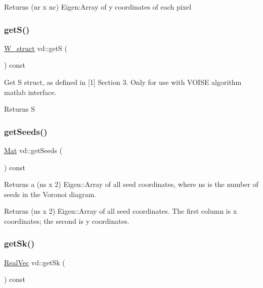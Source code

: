\begin{DoxyReturn}{Returns}
(nr x nc) Eigen\+:Array of y coordinates of each pixel 
\end{DoxyReturn}
\mbox{\label{classvd_a7f901e0c6d226b81f262c2363a69844a}} 
\subsubsection{\texorpdfstring{get\+S()}{getS()}}
{\footnotesize\ttfamily \mbox{\hyperlink{structW__struct}{W\+\_\+struct}} vd\+::getS (\begin{DoxyParamCaption}{ }\end{DoxyParamCaption}) const}



Get S struct, as defined in \mbox{[}1\mbox{]} Section 3. Only for use with V\+O\+I\+SE algorithm matlab interface. 

\begin{DoxyReturn}{Returns}
S 
\end{DoxyReturn}
\mbox{\label{classvd_a82f353c594c3c6b24f6077398f059d3a}} 
\subsubsection{\texorpdfstring{get\+Seeds()}{getSeeds()}}
{\footnotesize\ttfamily \mbox{\hyperlink{typedefs_8h_a9fa28c1f74e909474857584f5c7b0088}{Mat}} vd\+::get\+Seeds (\begin{DoxyParamCaption}{ }\end{DoxyParamCaption}) const}



Returns a (ns x 2) Eigen\+::\+Array of all seed coordinates, where ns is the number of seeds in the Voronoi diagram. 

\begin{DoxyReturn}{Returns}
(ns x 2) Eigen\+::\+Array of all seed coordinates. The first column is x coordinates; the second is y coordinates. 
\end{DoxyReturn}
\mbox{\label{classvd_adf9f15df018d2ceff5f68bdf7bd6f613}} 
\subsubsection{\texorpdfstring{get\+Sk()}{getSk()}}
{\footnotesize\ttfamily \mbox{\hyperlink{typedefs_8h_a84b6d9a0fbb45e01ad4a3aa5667f2992}{Real\+Vec}} vd\+::get\+Sk (\begin{DoxyParamCaption}{ }\end{DoxyParamCaption}) const}



